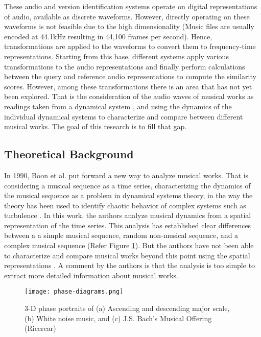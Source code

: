 \documentclass[../main.tex]{subfiles}
\begin{document}
\par
These audio and version identification systems operate on digital representations of audio, available as discrete waveforms. However, directly operating on these waveforms is not feasible due to the high dimensionality (Music files are usually encoded at 44.1kHz resulting in 44,100 frames per second). Hence, transformations are applied to the waveforms to convert them to frequency-time representations. Starting from this base, different systems apply various transformations to the audio representations  and finally perform calculations between the query and reference audio representations to compute the similarity scores. However, among these transformations there is an area that has not yet been explored. That is the consideration of the audio waves of musical works as readings taken from a dynamical system \cite{complex_dynamics}, and using the dynamics of the individual dynamical systems to characterize and compare between different musical works. The goal of this research is to fill that gap.




\subsection{Theoretical Background}

\par
In 1990, Boon et al. put forward a new way to analyze musical works. That is considering a musical sequence as a time series, characterizing the dynamics of the musical sequence as a problem in dynamical systems theory, in the way the theory has been used to identify chaotic behavior of complex systems such as turbulence \cite{complex_dynamics}. In this work, the authors analyze musical dynamics from a spatial representation of the time series. This analysis has established clear differences between a a simple musical sequence, random non-musical sequence, and a complex musical sequence (Refer Figure \ref{fig:phase-diagrams}). But the authors have not been able to characterize and compare musical works beyond this point using the spatial representations \cite{boonDynamicalSystemsTheory1995}. A comment by the authors is that the analysis is too simple to extract more detailed information about musical works.

\begin{figure}[h]
    \centering
    \texttt{[image: phase-diagrams.png]}
    \caption{3-D phase portraits of (a) Ascending and descending major scale, (b) White noise music, and (c) J.S. Bach's Musical Offering (Ricercar)}
    \label{fig:phase-diagrams}
\end{figure}
\end{document}
